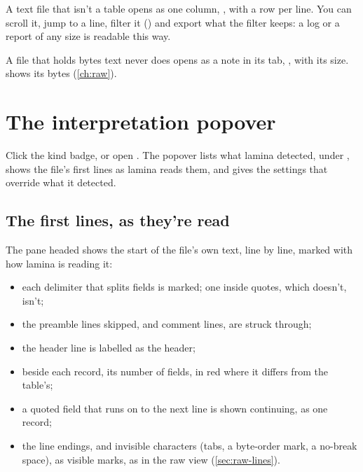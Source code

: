 A text file that isn't a table opens as one column, , with a row per line. You can scroll it,
jump to a line, filter it () and export what the filter keeps: a log or a
report of any size is readable this way.

A file that holds bytes text never does opens as a note in its tab, , with its size.
 shows its bytes (\cref{ch:raw}).

\section{The interpretation popover}\label{sec:interpretation}

Click the kind badge, or open . The popover lists
what lamina detected, under , shows the file's first lines as lamina reads them, and gives
the settings that override what it detected.


\subsection{The first lines, as they're read}\label{sec:first-lines}

The pane headed  shows the start of the file's own text, line by
line, marked with how lamina is reading it:

\begin{itemize}
\item each delimiter that splits fields is marked; one inside quotes, which doesn't, isn't;
\item the preamble lines skipped, and comment lines, are struck through;
\item the header line is labelled as the header;
\item beside each record, its number of fields, in red where it differs from the table's;
\item a quoted field that runs on to the next line is shown continuing, as one record;
\item the line endings, and invisible characters (tabs, a byte-order mark, a no-break space), as visible
marks, as in the raw view (\cref{sec:raw-lines}).
\end{itemize}

